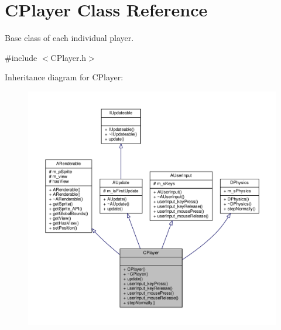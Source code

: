 \hypertarget{classCPlayer}{\section{C\-Player Class Reference}
\label{classCPlayer}
}


Base class of each individual player.  




{\ttfamily \#include $<$C\-Player.\-h$>$}



Inheritance diagram for C\-Player\-:\nopagebreak
\begin{figure}[H]
\begin{center}
\leavevmode
\includegraphics[width=350pt]{classCPlayer__inherit__graph}
\end{center}
\end{figure}


